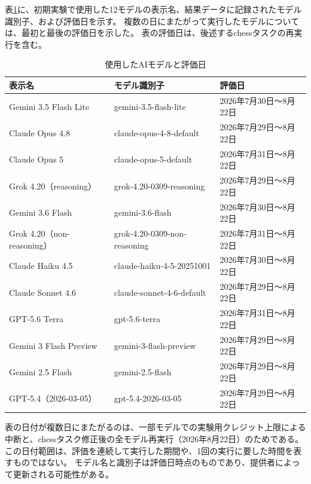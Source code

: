 \documentclass[11pt,a4paper]{ltjsarticle}
\begin{document}
表\ref{tab:model-experiment-dates}に、初期実験で使用した12モデルの表示名、結果データに記録されたモデル識別子、および評価日を示す。
複数の日にまたがって実行したモデルについては、最初と最後の評価日を示した。
表の評価日は、後述するchessタスクの再実行を含む。\begin{table}[htbp]
\centering
\scriptsize
\renewcommand{\arraystretch}{1.18}
\caption{使用したAIモデルと評価日}
\label{tab:model-experiment-dates}
\begin{tabularx}{\textwidth}{>{\raggedright\arraybackslash}p{42mm} >{\raggedright\arraybackslash\ttfamily}X >{\centering\arraybackslash\normalfont}p{34mm}}
  \toprule
  \normalfont\bfseries 表示名 & \normalfont\bfseries モデル識別子 & \normalfont\bfseries 評価日 \\
  \midrule
  Gemini 3.5 Flash Lite & gemini-3.5-flash-lite & 2026年7月30日～8月22日 \\
  Claude Opus 4.8 & claude-opus-4-8-default & 2026年7月29日～8月22日 \\
  Claude Opus 5 & claude-opus-5-default & 2026年7月31日～8月22日 \\
  Grok 4.20（reasoning） & grok-4.20-0309-reasoning & 2026年7月29日～8月22日 \\
  Gemini 3.6 Flash & gemini-3.6-flash & 2026年7月30日～8月22日 \\
  Grok 4.20（non-reasoning） & grok-4.20-0309-non-reasoning & 2026年7月31日～8月22日 \\
  Claude Haiku 4.5 & claude-haiku-4-5-20251001 & 2026年7月30日～8月22日 \\
  Claude Sonnet 4.6 & claude-sonnet-4-6-default & 2026年7月29日～8月22日 \\
  GPT-5.6 Terra & gpt-5.6-terra & 2026年7月31日～8月22日 \\
  Gemini 3 Flash Preview & gemini-3-flash-preview & 2026年7月29日～8月22日 \\
  Gemini 2.5 Flash & gemini-2.5-flash & 2026年7月29日～8月22日 \\
  GPT-5.4（2026-03-05） & gpt-5.4-2026-03-05 & 2026年7月29日～8月22日 \\
  \bottomrule
\end{tabularx}
\end{table}

表の日付が複数日にまたがるのは、一部モデルでの実験用クレジット上限による中断と、chessタスク修正後の全モデル再実行（2026年8月22日）のためである。
この日付範囲は、評価を連続して実行した期間や、1回の実行に要した時間を表すものではない。
モデル名と識別子は評価日時点のものであり、提供者によって更新される可能性がある。
\end{document}
